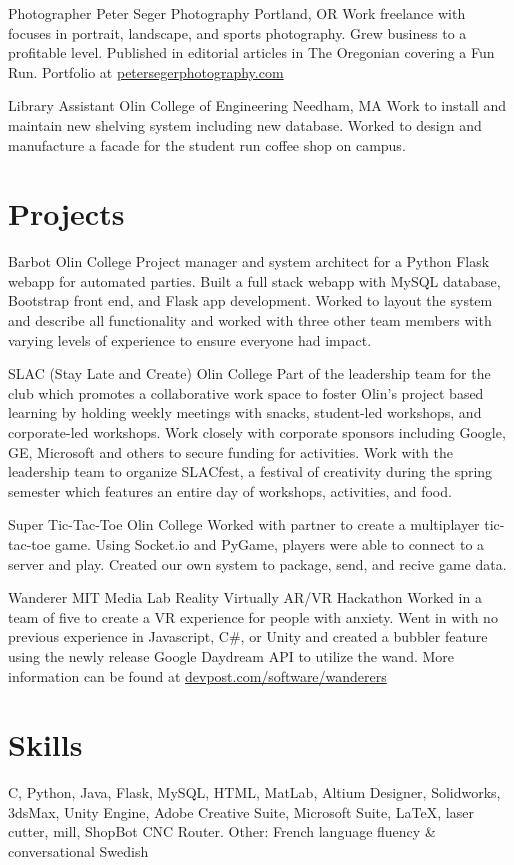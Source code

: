 \documentclass[11 pt]{moderncv}
\begin{document}
{Photographer}
{Peter Seger Photography}
{Portland, OR}
{}
{Work freelance with focuses in portrait, landscape, and sports photography. Grew business to a profitable level.
 Published in editorial articles in The Oregonian covering a Fun Run. Portfolio at \href{www.petersegerphotography.com}{petersegerphotography.com}}

{Library Assistant}
{Olin College of Engineering}
{Needham, MA}
{}
{Work to install and maintain new shelving system including new database. Worked to design and manufacture a facade for the student run coffee shop on campus.}

\vspace{0.03 in}
\section{Projects}

{Barbot}
{Olin College}
{}
{}
{Project manager and system architect for a Python Flask webapp for automated parties. Built a full stack webapp with MySQL database, Bootstrap front end, and Flask app development. Worked to layout the system and describe all functionality and worked with three other team members with varying levels of experience to ensure everyone had impact. }

{SLAC (Stay Late and Create)}
{Olin College}
{}
{}
{Part of the leadership team for the club which promotes a collaborative work space to foster Olin's project based learning by holding weekly meetings with snacks, student-led workshops, and corporate-led workshops. Work closely with corporate sponsors including Google, GE, Microsoft and others to secure funding for activities. Work with the leadership team to organize SLACfest, a festival of creativity during the spring semester which features an entire day of workshops, activities, and food.}

{Super Tic-Tac-Toe}
{Olin College}
{}
{}
{Worked with partner to create a multiplayer tic-tac-toe game. Using Socket.io and PyGame, players were able to connect to a server and play. Created our own system to package, send, and recive game data.}

{Wanderer}
{MIT Media Lab Reality Virtually AR/VR Hackathon}
{}
{}
{Worked in a team of five to create a VR experience for people with anxiety. Went in with no previous experience in Javascript, C\#, or Unity and created a bubbler feature using the newly release Google Daydream API to utilize the wand. More information can be found at \href{https://devpost.com/software/wanderers}{devpost.com/software/wanderers}}

\section{Skills}

\cvline{}
{
C,
Python,
Java,
Flask,
MySQL,
HTML,
MatLab,
Altium Designer,
Solidworks,
3dsMax,
Unity Engine,
Adobe Creative Suite,
Microsoft Suite,
\LaTeX{},
laser cutter,
mill,
ShopBot CNC Router.
}
\cvline{}
{Other: French language fluency \& conversational Swedish}
\end{document}
